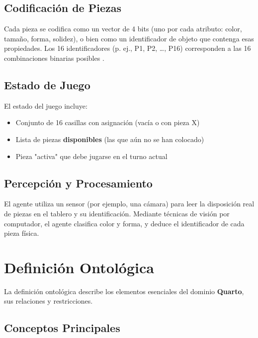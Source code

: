 \documentclass[conference]{IEEEtran}
\begin{document}
\subsection{Codificación de Piezas}
Cada pieza se codifica como un vector de 4 bits (uno por cada atributo: color, tamaño, forma, solidez), o bien como un identificador de objeto que contenga esas propiedades. Los 16 identificadores (p. ej., P1, P2, …, P16) corresponden a las 16 combinaciones binarias posibles \cite{muller2009}.

\subsection{Estado de Juego}
El estado del juego incluye:
\begin{itemize}
\item Conjunto de 16 casillas con asignación (vacía o con pieza X)
\item Lista de piezas \textbf{disponibles} (las que aún no se han colocado)
\item Pieza "activa" que debe jugarse en el turno actual
\end{itemize}

\subsection{Percepción y Procesamiento}
El agente utiliza un sensor (por ejemplo, una cámara) para leer la disposición real de piezas en el tablero y su identificación. Mediante técnicas de visión por computador, el agente clasifica color y forma, y deduce el identificador de cada pieza física.





\section{Definición Ontológica}

La definición ontológica describe los elementos esenciales del dominio \textbf{Quarto}, sus relaciones y restricciones.

\subsection{Conceptos Principales}
\end{document}
